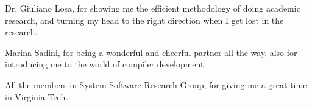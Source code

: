 \documentclass[12pt]{report}
\begin{document}
Dr. Giuliano Losa, for showing me the efficient methodology of doing academic research, and turning my head to the right direction when I get lost in the research.

Marina Sadini, for being a wonderful and cheerful partner all the way, also for introducing me to the world of compiler development.

All the members in System Software Research Group, for giving me a great time in Virginia Tech.

\tableofcontents
\pagebreak

\listoffigures
\pagebreak

\listoftables
\pagebreak

\pagestyle{myheadings}

\newcommand{\detstart}{\_\_det\_start}
\newcommand{\detend}{\_\_det\_end}
\newcommand{\dettick}{\_\_det\_tick}












%
\end{document}
